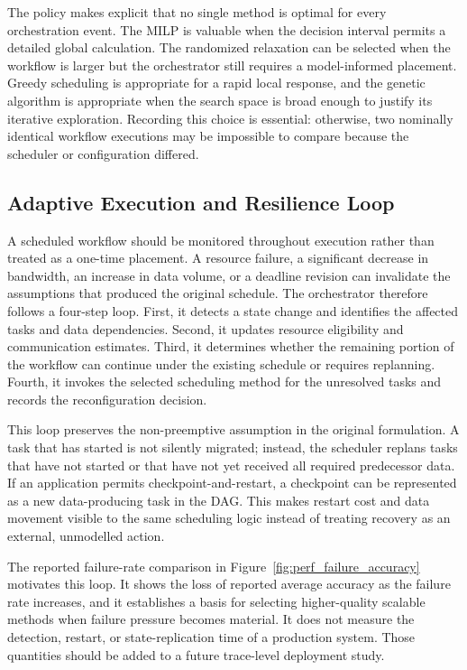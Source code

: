 The policy makes explicit that no single method is optimal for every orchestration event. The MILP is valuable when the decision interval permits a detailed global calculation. The randomized relaxation can be selected when the workflow is larger but the orchestrator still requires a model-informed placement. Greedy scheduling is appropriate for a rapid local response, and the genetic algorithm is appropriate when the search space is broad enough to justify its iterative exploration. Recording this choice is essential: otherwise, two nominally identical workflow executions may be impossible to compare because the scheduler or configuration differed.

\subsection{Adaptive Execution and Resilience Loop}

A scheduled workflow should be monitored throughout execution rather than treated as a one-time placement. A resource failure, a significant decrease in bandwidth, an increase in data volume, or a deadline revision can invalidate the assumptions that produced the original schedule. The orchestrator therefore follows a four-step loop. First, it detects a state change and identifies the affected tasks and data dependencies. Second, it updates resource eligibility and communication estimates. Third, it determines whether the remaining portion of the workflow can continue under the existing schedule or requires replanning. Fourth, it invokes the selected scheduling method for the unresolved tasks and records the reconfiguration decision.

This loop preserves the non-preemptive assumption in the original formulation. A task that has started is not silently migrated; instead, the scheduler replans tasks that have not started or that have not yet received all required predecessor data. If an application permits checkpoint-and-restart, a checkpoint can be represented as a new data-producing task in the DAG. This makes restart cost and data movement visible to the same scheduling logic instead of treating recovery as an external, unmodelled action.

The reported failure-rate comparison in Figure~\ref{fig:perf_failure_accuracy} motivates this loop. It shows the loss of reported average accuracy as the failure rate increases, and it establishes a basis for selecting higher-quality scalable methods when failure pressure becomes material. It does not measure the detection, restart, or state-replication time of a production system. Those quantities should be added to a future trace-level deployment study.

